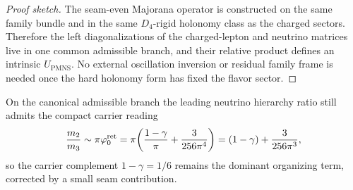 \begin{proof}[Proof sketch]
The seam-even Majorana operator is constructed on the same family bundle and in the same
$D_4$-rigid holonomy class as the charged sectors. Therefore the left diagonalizations of the
charged-lepton and neutrino matrices live in one common admissible branch, and their relative
product defines an intrinsic $U_{\mathrm{PMNS}}$. No external oscillation inversion or residual
family frame is needed once the hard holonomy form has fixed the flavor sector.
\end{proof}

\begin{remark}
On the canonical admissible branch the leading neutrino hierarchy ratio still admits the
compact carrier reading
\[
\frac{m_2}{m_3}\sim \pi\varphi_0^{\mathrm{ret}}
=
\pi\!\left(\frac{1-\gamma}{\pi}+\frac{3}{256\pi^4}\right)
=
(1-\gamma)+\frac{3}{256\pi^3},
\]
so the carrier complement $1-\gamma=1/6$ remains the dominant organizing term, corrected by a
small seam contribution.
\end{remark}

